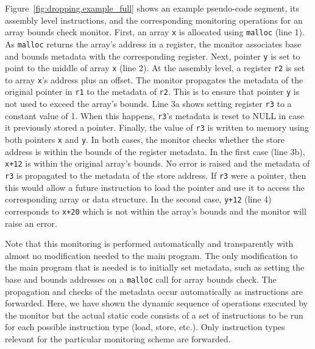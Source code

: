 Figure~\ref{fig:dropping.example_full} shows an example pseudo-code segment,
its assembly level instructions, and the corresponding monitoring operations
for an array bounds check monitor. 
First, an array {\tt x} is allocated using {\tt malloc} (line 1). 
As {\tt malloc} returns the array's address in a register, the monitor
associates base and bounds metadata with the corresponding register. 
Next, pointer {\tt y} is set to point to the middle of array {\tt x} (line 2). 
At the assembly level, a register {\tt r2} is set to array {\tt x}'s address plus an offset.
The monitor propagates the metadata of the original pointer in {\tt r1} to the
metadata of {\tt r2}. This is to ensure that pointer {\tt y} is not used to exceed the array's bounds.
Line 3a shows setting register {\tt r3} to a constant value of 1.
When this happens,
{\tt r3}'s metadata is reset to NULL in case it previously stored a
pointer. 
Finally, the value of {\tt r3} is written to memory using both pointers {\tt x} and {\tt y}.
In both cases, the monitor checks whether the store address is within the bounds of the register metadata. In the first case (line 3b), {\tt x+12}
is within the original array's bounds. No error is raised and the metadata of
{\tt r3} is propagated to the metadata of the store address. If {\tt r3} were a
pointer, then this would allow a future instruction to load the pointer and use
it to access the corresponding array or data structure. In the second case,
{\tt y+12} (line 4) corresponds to {\tt x+20} which is not within the array's bounds and
the monitor will raise an error. 

Note that this monitoring is performed automatically and transparently with
almost no modification needed to the main program. The only modification to
the main program that is needed is to initially set metadata, such as setting
the base and bounds addresses on a {\tt malloc} call for array bounds check.
The propagation and checks of the metadata occur automatically as
instructions are forwarded.
Here, we have shown the dynamic sequence of operations executed by the monitor but
the actual static code consists of a set of instructions to be run for each
possible instruction type (load, store, etc.). Only instruction types relevant
for the particular monitoring scheme are forwarded.

